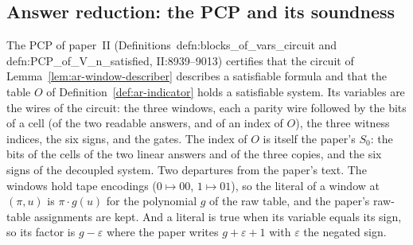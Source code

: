 \subsection{Answer reduction: the PCP and its soundness}

The PCP of paper~II (Definitions~defn:blocks\_of\_vars\_circuit and
defn:PCP\_of\_V\_n\_satisfied, II:8939--9013) certifies that the circuit of
Lemma~\ref{lem:ar-window-describer} describes a satisfiable formula and that the table $O$ of
Definition~\ref{def:ar-indicator} holds a satisfiable system. Its variables are the wires of the
circuit: the three windows, each a parity wire followed by the bits of a cell (of the two readable
answers, and of an index of $O$), the three witness indices, the six signs, and the gates. The
index of $O$ is itself the paper's $S_0$: the bits of the cells of the two linear answers and of
the three copies, and the six signs of the decoupled system. Two departures from the paper's text.
The windows hold tape encodings ($0 \mapsto 00$, $1 \mapsto 01$), so the literal of a window at
$(\pi, u)$ is $\pi \cdot g(u)$ for the polynomial $g$ of the raw table, and the paper's raw-table
assignments are kept. And a literal is true when its variable equals its sign, so its factor is
$g - \varepsilon$ where the paper writes $g + \varepsilon + 1$ with $\varepsilon$ the negated sign.

